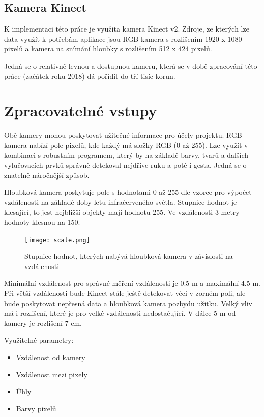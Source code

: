 \subsection{Kamera Kinect}
K implementaci této práce je využita kamera Kinect v2. Zdroje, ze kterých lze data využít k potřebám aplikace jsou RGB kamera s rozlišením 1920 x 1080 pixelů a kamera na snímání hloubky s rozlišením 512 x 424 pixelů.

Jedná se o relativně levnou a dostupnou kameru, která se v době zpracování této práce (začátek roku 2018) dá pořídit do tří tisíc korun.

\section{Zpracovatelné vstupy}

Obě kamery mohou poskytovat užitečné informace pro účely projektu. RGB kamera nabízí pole pixelů, kde každý má složky RGB (0 až 255). Lze využít v kombinaci s robustním programem, který by na základě barvy, tvarů a dalších vylučovacích prvků správně detekoval nejdříve ruku a poté i gesta. Jedná se o znatelně náročnější způsob.

Hloubková kamera poskytuje pole s hodnotami 0 až 255 dle vzorce pro výpočet vzdálenosti na základě doby letu infračerveného světla. Stupnice hodnot je klesající, to jest nejbližší objekty mají hodnotu 255. Ve vzdálenosti 3 metry hodnoty klesnou na 150. 

\begin{figure}[htp]
\centering
\texttt{[image: scale.png]}
\caption{Stupnice hodnot, kterých nabývá hloubková kamera v závislosti na vzdálenosti}
\label{fig:scale}
\end{figure}

Minimální vzdálenost pro správné měření vzdálenosti je 0.5 m a maximální 4.5 m. Při větší vzdálenosti bude Kinect stále ještě detekovat věci v zorném poli, ale bude poskytovat nepřesná data a hloubková kamera pozbydu užitku. Velký vliv má i rozlišení, které je pro velké vzdálenosti nedostačující. V dálce 5 m od kamery je rozlišení 7 cm.

Využitelné parametry:

\begin{itemize}
\item Vzdálenost od kamery
\item Vzdálenost mezi pixely
\item Úhly
\item Barvy pixelů
\end{itemize}

